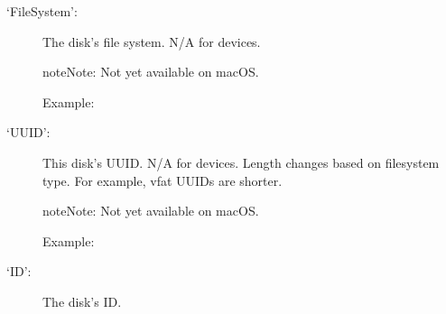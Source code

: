 \documentclass[letterpaper,10pt,english]{sphinxmanual}
\begin{document}
\begin{description}
\begin{description}
\end{description}

\item[{‘FileSystem’:}] \leavevmode
The disk’s file system. N/A for devices.

\begin{sphinxadmonition}{note}{Note:}
Not yet available on macOS.
\end{sphinxadmonition}
\begin{description}
\item[{Example:}] \leavevmode
\begin{sphinxVerbatim}[commandchars=\\\{\}]
\PYG{p}{[}\PYG{p}{]}\PYG{p}{[}\PYG{p}{]}
\end{sphinxVerbatim}

\end{description}

\item[{‘UUID’:}] \leavevmode
This disk’s UUID. N/A for devices. Length changes based on filesystem
type. For example, vfat UUIDs are shorter.

\begin{sphinxadmonition}{note}{Note:}
Not yet available on macOS.
\end{sphinxadmonition}
\begin{description}
\item[{Example:}] \leavevmode
\begin{sphinxVerbatim}[commandchars=\\\{\}]
\PYG{p}{[}\PYG{p}{]}\PYG{p}{[}\PYG{p}{]}
\end{sphinxVerbatim}

\end{description}

\item[{‘ID’:}] \leavevmode
The disk’s ID.


\end{description}
\end{document}
